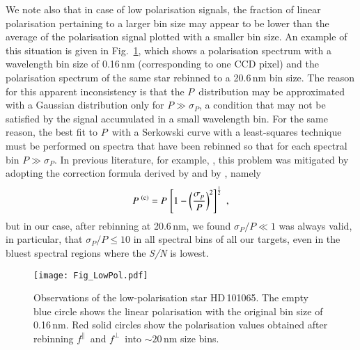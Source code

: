 \documentclass[a4paper]{aa}
\newcommand{\pl}{\ensuremath{P}}
\newcommand{\fo}{\ensuremath{f^\parallel}}
\newcommand{\fe}{\ensuremath{f^\perp}}
\begin{document}
We note also that in case of low polarisation
signals, the fraction of linear polarisation pertaining to a larger
bin size may appear to be lower than the average of the polarisation signal
plotted with a smaller bin size. An example of this situation is given in
Fig.~\ref{Fig_LowPol}, which shows a polarisation spectrum with a
wavelength bin size of 0.16\,nm (corresponding to one CCD pixel) and
the polarisation spectrum of the same star rebinned to a 20.6\,nm bin
size. The reason for this apparent inconsistency is that the \pl\ distribution
may be approximated with a Gaussian distribution only for $\pl \gg
\sigma_P$, a condition that may not be satisfied by the signal
accumulated in a small wavelength bin. For the same reason, the
best fit to \pl\ with a Serkowski curve with a least-squares technique
must be performed on spectra that have been rebinned so that for each
spectral bin $\pl \gg \sigma_P$. In previous literature, for
example,
\citet{Whietal92}, this problem was mitigated by adopting the
correction formula derived by
\citet{WarKro74} and by \citet{ClaStu86}, namely
\begin{equation}
  \pl^{\rm \ (c)} = \pl\,\left[1-\left(\frac{\sigma_p}{\pl}\right)^2\right]^\frac{1}{2} \;,
  \label{Eq_Correction}
\end{equation}
but in our case, after rebinning at 20.6\,nm, we found
$\sigma_P/P \ll 1$ was always valid, in particular, that
$\sigma_P/P \le 10$ in all spectral bins of all our targets,
even in the bluest spectral regions where the {\it S/N} is lowest.

\begin{figure}
\begin{center}
\texttt{[image: Fig\_LowPol.pdf]}
\end{center}
\caption{\label{Fig_LowPol} Observations of the low-polarisation star HD\,101065.
  The empty blue circle shows the linear polarisation with the original bin size of 0.16\,nm.
  Red solid circles show the polarisation values obtained after rebinning \fo\ and \fe\ into
  $\sim 20$\,nm size bins.}
\end{figure}

\end{document}
